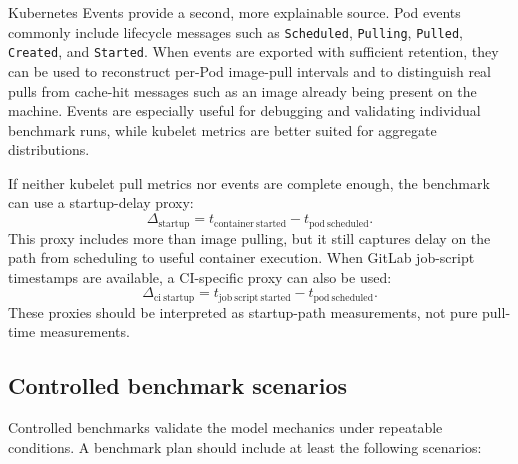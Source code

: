 \documentclass[11pt,a4paper]{article}
\begin{document}
Kubernetes Events provide a second, more explainable source. Pod events commonly include lifecycle messages such as \texttt{Scheduled}, \texttt{Pulling}, \texttt{Pulled}, \texttt{Created}, and \texttt{Started}. When events are exported with sufficient retention, they can be used to reconstruct per-Pod image-pull intervals and to distinguish real pulls from cache-hit messages such as an image already being present on the machine. Events are especially useful for debugging and validating individual benchmark runs, while kubelet metrics are better suited for aggregate distributions.

If neither kubelet pull metrics nor events are complete enough, the benchmark can use a startup-delay proxy:
\begin{equation}
  \Delta_{\mathrm{startup}}
  =
  t_{\mathrm{container\ started}} - t_{\mathrm{pod\ scheduled}}.
\end{equation}
This proxy includes more than image pulling, but it still captures delay on the path from scheduling to useful container execution. When GitLab job-script timestamps are available, a CI-specific proxy can also be used:
\begin{equation}
  \Delta_{\mathrm{ci\ startup}}
  =
  t_{\mathrm{job\ script\ started}} - t_{\mathrm{pod\ scheduled}}.
\end{equation}
These proxies should be interpreted as startup-path measurements, not pure pull-time measurements.

\subsection{Controlled benchmark scenarios}

Controlled benchmarks validate the model mechanics under repeatable conditions. A benchmark plan should include at least the following scenarios:
\end{document}
